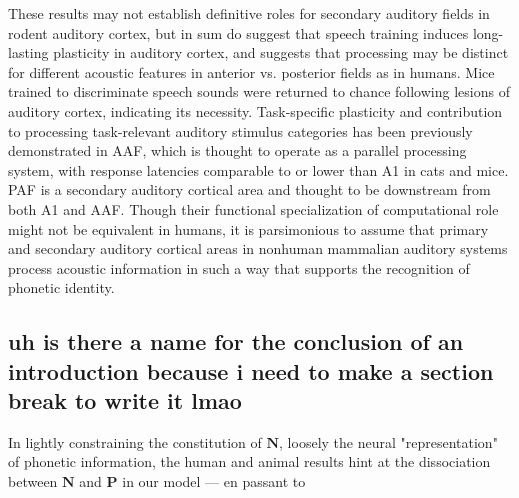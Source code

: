 These results\cite{engineerSpeechTrainingAlters2015a} may not establish definitive roles for secondary auditory fields in rodent auditory cortex, but in sum do suggest that speech training induces long-lasting plasticity in auditory cortex, and suggests that processing may be distinct for different acoustic features in anterior vs. posterior fields as in humans. Mice trained to discriminate speech sounds were returned to chance following lesions of auditory cortex\cite{saundersMiceCanLearn2019}, indicating its necessity. Task-specific plasticity\cite{takahashiLearningstagedependentFieldspecificMap2011} and contribution to processing task-relevant auditory stimulus categories\cite{shiAnteriorAuditoryField2019} has been previously demonstrated in AAF, which is thought to operate as a parallel processing system, with response latencies comparable to or lower than A1 in cats\cite{carrascoNeuronalActivationTimes2011} and mice\cite{lindenSpectrotemporalStructureReceptive2003b}. PAF is a secondary auditory cortical area and thought to be downstream from both A1 and AAF\cite{pandyaSpectralTemporalProcessing2008,carrascoEvidenceHierarchicalProcessing2009}. Though their functional specialization of computational role might not be equivalent in humans, it is parsimonious to assume that primary and secondary auditory cortical areas in nonhuman mammalian auditory systems process acoustic information in such a way that supports the recognition of phonetic identity. 


\subsection{uh is there a name for the conclusion of an introduction because i need to make a section break to write it lmao}

In lightly constraining the constitution of $\mathbf{N}$, loosely the neural "representation" of phonetic information, the human and animal results hint at the dissociation between $\mathbf{N}$ and $\mathbf{P}$ in our model --- en passant to  

